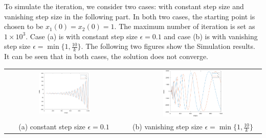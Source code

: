 \documentclass[a4 paper, 12pt]{article}
\begin{document}
To simulate the iteration, we consider two cases: with constant step size and vanishing step size in the following part. In both two cases, the starting point is chosen to be $x_1(0) = x_2(0) = 1$. The maximum number of iteration is set as $1\times 10^3$. Case (a) is with constant step size $\epsilon = 0.1$ and case (b) is with vanishing step size $\epsilon = \min\{1,\frac{10}{k}\}$. The following two figures show the Simulation results. It can be seen that in both cases, the solution does not converge. 
\begin{center}
        \begin{tabular}{c c}
                \includegraphics[width=0.45\textwidth]{E209_cons_state.pdf} & \includegraphics[width=0.45\textwidth]{E209_van_state.pdf} \\
                (a) constant step size $\epsilon=0.1$ & (b) vanishing step size $\epsilon = \min\{1,\frac{10}{k}\}$
        \end{tabular}
\end{center}





\vspace{2em}
\end{document}
